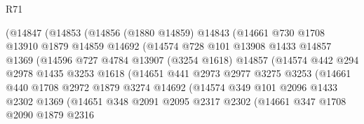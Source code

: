 \begin{lexlean}{R71}
\begin{coremodule}
                    (@14847
                      (@14853
                        (@14856
                          (@1880 @14859)
                          @14843
                          (@14661
                            @730
                            @1708
                            @13910
                            @1879
                            @14859
                            @14692
                            (@14574
                              @728
                              @101
                              @13908
                              @1433
                              @14857
                              @1369
                              (@14596
                                @727
                                @4784
                                @13907
                                (@3254 @1618)
                                @14857
                                (@14574
                                  @442
                                  @294
                                  @2978
                                  @1435
                                  @3253
                                  @1618
                                  (@14651
                                    @441
                                    @2973
                                    @2977
                                    @3275
                                    @3253
                                    (@14661
                                      @440
                                      @1708
                                      @2972
                                      @1879
                                      @3274
                                      @14692
                                      (@14574
                                        @349
                                        @101
                                        @2096
                                        @1433
                                        @2302
                                        @1369
                                        (@14651
                                          @348
                                          @2091
                                          @2095
                                          @2317
                                          @2302
                                          (@14661
                                            @347
                                            @1708
                                            @2090
                                            @1879
                                            @2316

\end{coremodule}
\end{lexlean}
